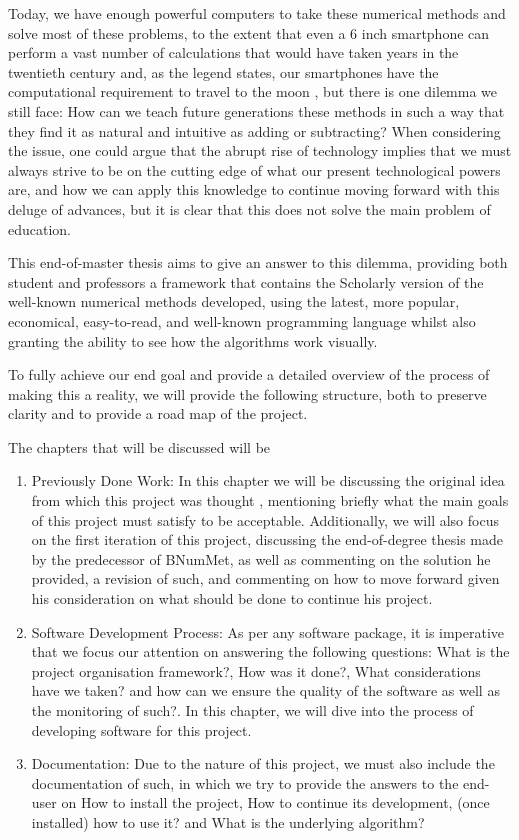 Today, we have enough powerful computers to take these numerical methods and solve most of these problems, to the extent that even a 6 inch smartphone can perform a vast number of calculations that would have taken years in the twentieth century and, as the legend states, our smartphones have the computational requirement to travel to the moon , but there is one dilemma we still face: How can we teach future generations these methods in such a way that they find it as natural and intuitive as adding or subtracting? When considering the issue, one could argue that the abrupt rise of technology implies that we must always strive to be on the cutting edge of what our present technological powers are, and how we can apply this knowledge to continue moving forward with this deluge of advances,  but it is clear that this does not solve the main problem of education.


This end-of-master thesis aims to give an answer to this dilemma, providing both student and professors a framework that contains the Scholarly version of the well-known numerical methods developed, using the latest, more popular, economical, easy-to-read, and well-known programming language whilst also granting the ability to see how the algorithms work visually.  

To fully achieve our end goal and provide a detailed overview of the process of making this a reality, we will provide the following structure, both to preserve clarity and to provide a road map of the project. 

The chapters that will be discussed will be
\begin{enumerate}
    \item Previously Done Work:
        In this chapter we will be discussing the original idea from which this project was thought , mentioning briefly what the main goals of this project must satisfy to be acceptable. Additionally, we will also focus on the first iteration of this project, discussing the end-of-degree thesis made by the predecessor of BNumMet, as well as commenting on the solution he provided, a revision of such, and commenting on how to move forward given his consideration on what should be done to continue his project.    
    \item Software Development Process:
    As per any software package, it is imperative that we focus our attention on answering the following questions: What is the project organisation framework?, How was it done?, What considerations have we taken? and how can we ensure the quality of the software as well as the monitoring of such?. In this chapter, we will dive into the process of developing software for this project. 
    
    \item Documentation:
    Due to the nature of this project, we must also include the documentation of such, in which we try to provide the answers to the end-user on How to install the project, How to continue its development, (once installed) how to use it? and What is the underlying algorithm?
\end{enumerate}
